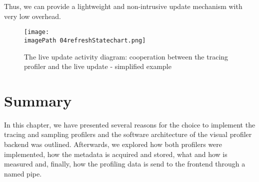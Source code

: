 Thus, we can provide a lightweight and non-intrusive update mechanism with very low overhead. 

\begin{figure}
	\centering
		\texttt{[image: \\imagePath 04refreshStatechart.png]}
		\caption{The live update activity diagram: cooperation between the tracing profiler and the live update  - simplified example }
	\label{fig:04refreshStatechart}
\end{figure}

 
\section{Summary}
In this chapter, we have presented several reasons for the choice to implement the tracing and sampling profilers and the software architecture of the visual profiler backend was outlined. Afterwards, we explored how both profilers were implemented, how the metadata is acquired and stored, what and how is measured and, finally, how the profiling data is send to the frontend through a named pipe.







